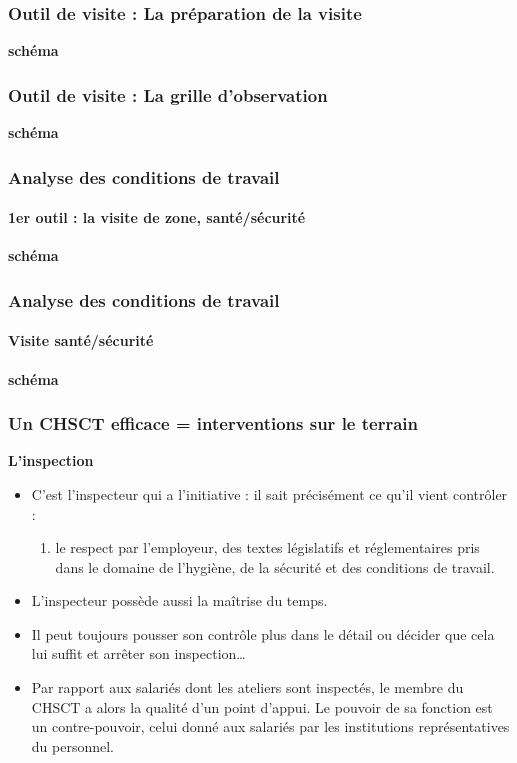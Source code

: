 \documentclass{beamer}
\begin{document}
\begin{frame}
\frametitle{Outil de visite : La préparation de la visite}

\textbf{schéma}
\end{frame}

\begin{frame}
\frametitle{Outil de visite : La grille d’observation}

\textbf{schéma}
\end{frame}

\begin{frame}
\frametitle{Analyse des conditions de travail}
\framesubtitle{1er outil : la visite de zone, santé/sécurité}
\textbf{schéma}
\end{frame}

\begin{frame}
\frametitle{Analyse des conditions de travail}
\framesubtitle{Visite santé/sécurité}
\textbf{schéma}
\end{frame}


\begin{frame}
\frametitle{Un CHSCT efficace = interventions sur le terrain}

\textbf{L’inspection}
\begin{itemize}
\item C’est l’inspecteur qui a l’initiative : il sait précisément ce qu’il vient contrôler :

\begin{enumerate}
\item le respect par l’employeur, des textes législatifs et réglementaires pris dans le domaine de l’hygiène, de la sécurité et des conditions de travail.
\end{enumerate}
\item L’inspecteur possède aussi la maîtrise du temps. 

\item Il peut toujours pousser son contrôle plus dans le détail ou décider que cela lui suffit et arrêter son inspection… 

\item Par rapport aux salariés dont les ateliers sont inspectés, le membre du CHSCT a alors la qualité d’un point d’appui. Le pouvoir de sa fonction est un contre-pouvoir, celui donné aux salariés par les institutions représentatives du personnel.
\end{itemize}
\end{frame}
\end{document}
